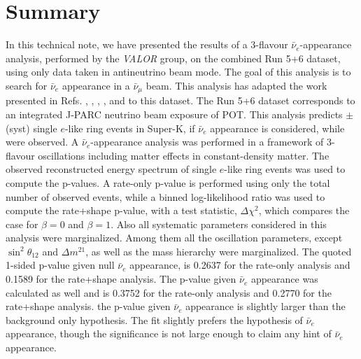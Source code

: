 \clearpage


\section {Summary}
\label{sec:summary}

In this technical note,
we have presented the results of a 3-flavour $\bar{\nu}_e$-appearance analysis,
performed by the {\em VALOR} group,
on the combined Run 5+6 \TotalPot{} dataset, using only data taken in antineutrino beam mode.
The goal of this analysis is to search for $\bar{\nu}_e$ appearance in a $\bar{\nu}_{\mu}$ beam.
This analysis has adapted the work presented in
Refs. \cite{OurRun1DisappAnalysis}, 
\cite{OurRun12DisappAnalysis}, 
\cite{OurRun12DisappAnalysis3Flavour},
\cite{OurRun123DisappAnalysis3Flavour},
\cite{OurRun1234aDisappAnalysis3Flavour} and 
\cite{OurRun1234DisappAnalysis3Flavour}
to this dataset. The Run 5+6 dataset corresponds to an integrated J-PARC neutrino beam
exposure of \TotalPot{} POT.
This analysis predicts \NskOscExpectation{} $\pm$ \NskOscExpectationError{} (syst)
single $e$-like ring events in Super-K, if $\bar{\nu}_e$ appearance is considered,
while \NskObserved{} were observed. 
A $\bar{\nu}_{e}$-appearance analysis was performed
in a framework of 3-flavour oscillations including matter effects in constant-density matter.
The observed reconstructed energy spectrum of single $e$-like ring events was used to 
compute the p-values.
A rate-only p-value is performed using only the total number of observed events, 
while a binned log-likelihood ratio was used to compute the rate+shape p-value,
with a test statistic, $\Delta \chi^2$, which compares the case for $\beta=0$ and $\beta=1$.
Also all \NSyst{} systematic parameters considered in this analysis were marginalized.
Among them all the oscillation parameters, except $\sin^2 \theta_{12}$ and $\Delta m^{21}$, 
as well as the mass hierarchy were marginalized.
The quoted 1-sided p-value given null $\bar{\nu}_e$ appearance, is 0.2637 for the rate-only analysis
and 0.1589 for the rate+shape analysis.
The p-value given $\bar{\nu}_e$ appearance was calculated as well and is
0.3752 for the rate-only analysis and 0.2770 for the rate+shape analysis.
the p-value given $\bar{\nu}_e$ appearance is slightly larger than the background only hypothesis. 
The fit slightly prefers the hypothesis of $\bar{\nu}_e$ appearance,
though the significance is not large enough to claim any hint of $\bar{\nu}_e$ appearance.

